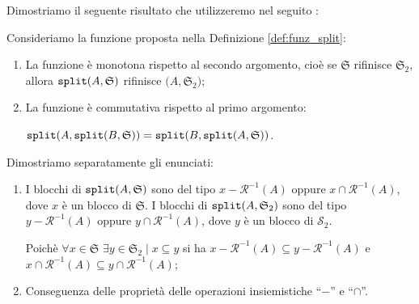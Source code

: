 Dimostriamo il seguente risultato che utilizzeremo nel seguito \cite{dovier}:
\begin{theorem}
    \label{theo:split_properties}
    Consideriamo la funzione \splitfunc proposta nella Definizione \ref{def:funz_split}:
    \begin{enumerate}
        \item La funzione è monotona rispetto al secondo argomento, cioè se $\mathfrak{S}$ rifinisce $\mathfrak{S}_2$, allora $\texttt{\textup{split}}(A,\mathfrak{S})$ rifinisce $\mathfrak(A,\mathfrak{S}_2)$;
        \item La funzione è commutativa rispetto al primo argomento:

        $\texttt{\textup{split}}(A,\texttt{\textup{split}}(B,\mathfrak{S})) = \texttt{\textup{split}}(B, \texttt{\textup{split}}(A,\mathfrak{S}))$.
    \end{enumerate}
\end{theorem}
\begin{proof2}
    Dimostriamo separatamente gli enunciati:
    \begin{enumerate}
        \item I blocchi di $\texttt{\textup{split}}(A,\mathfrak{S})$ sono del tipo $x - \mathcal{R}^{-1}(A)$ oppure $x \cap \mathcal{R}^{-1}(A)$, dove $x$ è un blocco di $\mathfrak{S}$. I blocchi di $\texttt{\textup{split}}(A,\mathfrak{S}_2)$ sono del tipo $y - \mathcal{R}^{-1}(A)$ oppure $y \cap \mathcal{R}^{-1}(A)$, dove $y$ è un blocco di $\mathcal{S}_2$.

        Poichè $\forall x \in \mathfrak{S} \,\,\exists y \in \mathfrak{S}_2 \mid x \subseteq y$ si ha $x - \mathcal{R}^{-1}(A) \subseteq y - \mathcal{R}^{-1}(A)$ e $x \cap \mathcal{R}^{-1}(A) \subseteq y \cap \mathcal{R}^{-1}(A)$;
        \item Conseguenza delle proprietà delle operazioni insiemistiche ``$-$'' e ``$\cap$''.
    \end{enumerate}
\end{proof2}
